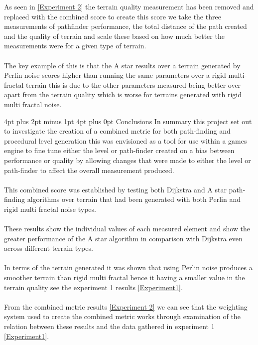 \documentclass[12pt,a4paper]{article}
\makeatletter
\renewcommand\section{\@startsection {section}{1}{0mm} %
                               {4pt plus 2pt minus 1pt} %
                               {4pt plus 0pt} %
                               {\bfseries}}
\makeatother
\begin{document}
As seen in \ref{Experiment 2} the terrain quality measurement has been removed and replaced with the combined score to create this score we take the three measurements of pathfinder performance, the total distance of the path created and the quality of terrain and scale these based on how much better the measurements were for a given type of terrain.\\\\The key example of this is that the A star results over a terrain generated by Perlin noise scores higher than running the same parameters over a rigid multi-fractal terrain this is due to the other parameters measured being better over apart from the terrain quality which is worse for terrains generated with rigid multi fractal noise.       

\newpage
\section{Conclusions}
In summary this project set out to investigate the creation of a combined metric for both path-finding and procedural level generation this was envisioned as a tool for use within a games engine to fine tune either the level or path-finder created on a bias between performance or quality by allowing changes that were made to either the level or path-finder to affect the overall measurement produced.\\\\This combined score was established by testing both Dijkstra and A star path-finding algorithms over terrain that had been generated with both Perlin and rigid multi fractal noise types.\\\\These results show the individual values of each measured element and show the greater performance of the A star algorithm in comparison with Dijkstra even across different terrain types.\\\\In terms of the terrain generated it was shown that using Perlin noise produces a smoother terrain than rigid multi fractal hence it having a smaller value in the terrain quality see the experiment 1 results \ref{Experiment1}.\\\\ From the combined metric results \ref{Experiment 2} we can see that the weighting system used to create the combined metric works through examination of the relation between these results and the data gathered in experiment 1 \ref{Experiment1}.
\end{document}
